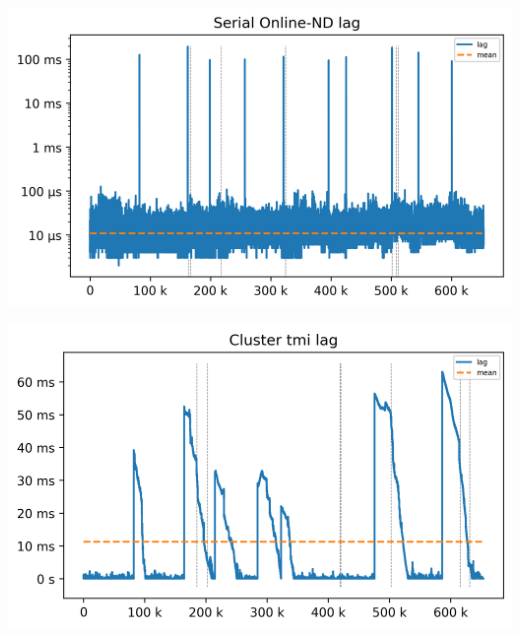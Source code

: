 \documentclass[aspectratio=1610,10pt]{beamer}
\begin{document}
\begin{frame}\centering
  \includegraphics[width=1\linewidth]{experiments/lag-serial.png}
\end{frame}
\begin{frame}\centering
  \includegraphics[width=1\linewidth]{experiments/lag-mfog.png}
\end{frame}
\end{document}
